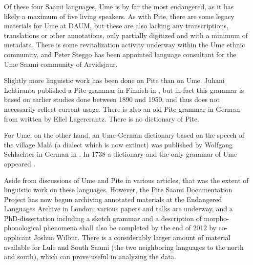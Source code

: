 \documentclass[a4paper,12pt]{article}
\begin{document}
Of these four Saami languages, Ume is by far the most endangered, as it has likely a maximum of five living speakers. As with Pite, there are some legacy materials for Ume at DAUM, but these are also lacking any transcriptions, translations or other annotations, only partially digitized and with a minimum of metadata. There is some revitalization activity underway within the Ume ethnic community, and Peter Steggo has been appointed language consultant for the Ume Saami community of Arvidsjaur.

Slightly more linguistic work has been done on Pite than on Ume. Juhani Lehtiranta published a Pite grammar in Finnish in \citeyear{lehtiranta1992}, but in fact this grammar is based on earlier studies done between 1890 and 1950, and thus does not necessarily reflect current usage. There is also an old Pite grammar in German from \citeyear{lagercrantz1926} written by Eliel Lagercrantz. There is no dictionary of Pite.

For Ume, on the other hand, an Ume-German dictionary based on the speech of the village Malå (a dialect which is now extinct) was published by Wolfgang Schlachter in German in \citeyear{schlachter1958}. In 1738 a dictionary and the only grammar of Ume appeared \cite{fjellstrom1738a,1738b}. 

Aside from discussions of Ume and Pite in various articles, that was the extent of linguistic work on these languages. However, the Pite Saami Documentation Project has now begun archiving annotated materials at the Endangered Languages Archive in London; %
 various papers and talks are underway, and a PhD-dissertation including a sketch grammar and a description of morpho-phonological phenomena shall also be completed by the end of 2012 by co-applicant Joshua Wilbur. There is a considerably larger amount of material available for Lule and South Saami (the two neighboring languages to the north and south), which can prove useful in analyzing the data.

\end{document}
